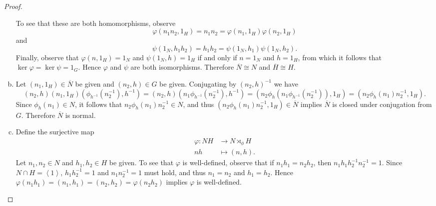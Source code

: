 \documentclass[10pt]{amsart}
\begin{document}
\begin{thm}
\begin{proof}
\begin{enumerate}[(a)]
      To see that these are both homomorphisms, observe
      $$\varphi(n_1n_2, 1_H) = n_1n_2 = \varphi(n_1, 1_H)\varphi(n_2, 1_H)$$
      and
      $$\psi(1_N, h_1h_2) = h_1h_2 = \psi(1_N, h_1)\psi(1_N, h_2).$$
      Finally, observe that $\varphi(n,1_H) = 1_N$ and $\psi(1_N, h) = 1_H$ if and only if $n = 1_N$ and $h = 1_H$, from which it follows that $\ker\varphi = \ker\psi = 1_G$.
      Hence $\varphi$ and $\psi$ are both isomorphisms.
      Therefore $\overline{N} \cong N$ and $\overline{H} \cong H$.
    \item
      Let $(n_1, 1_H) \in \overline{N}$ be given and $(n_2, h) \in G$ be given.
      Conjugating by $(n_2, h)^{-1}$ we have
      $$(n_2, h)(n_1, 1_H)(\phi_{h^{-1}}(n_2^{-1}), h^{-1}) = (n_2, h)(n_1\phi_{h^{-1}}(n_2^{-1}), h^{-1}) = (n_2\phi_h(n_1\phi_{h^{-1}}(n_2^{-1})), 1_H) = (n_2\phi_h(n_1)n_2^{-1}, 1_H).$$
      Since $\phi_h(n_1) \in N$, it follows that $n_2\phi_h(n_1)n_2^{-1} \in N$, and thus $(n_2\phi_h(n_1)n_2^{-1}, 1_H) \in \overline{N}$ implies $\overline{N}$ is closed under conjugation from $G$.
      Therefore $\overline{N}$ is normal.
      
    \item
      Define the surjective map
      \begin{align*}
	\varphi \colon NH &\rightarrow N \rtimes_\phi H\\
	nh & \mapsto (n, h).
      \end{align*}
      Let $n_1, n_2 \in N$ and $h_1, h_2 \in H$ be given.
      To see that $\varphi$ is well-defined, observe that if $n_1h_1 = n_2h_2$, then $n_1h_1h_2^{-1}n_2^{-1} = 1$.
      Since $N \cap H = \left< 1 \right>$, $h_1h_2^{-1} = 1$ and $n_1n_2^{-1} = 1$ must hold, and thus $n_1 = n_2$ and $h_1 = h_2$.
      Hence $\varphi(n_1h_1) = (n_1,h_1) = (n_2, h_2) = \varphi(n_2h_2)$ implies $\varphi$ is well-defined.
      

\end{enumerate}
\end{proof}
\end{thm}
\end{document}
